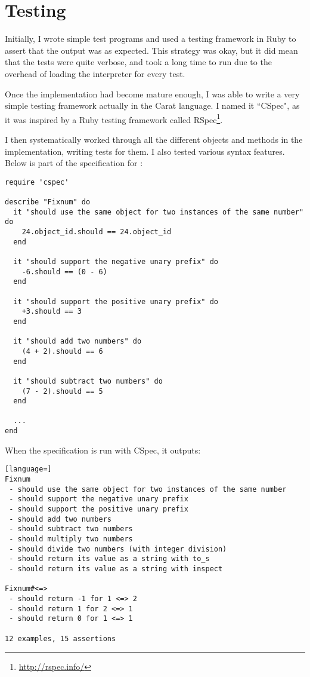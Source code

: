 \section{Testing}

Initially, I wrote simple test programs and used a testing framework in Ruby to assert that the output was as expected. This strategy was okay, but it did mean that the tests were quite verbose, and took a long time to run due to the overhead of loading the interpreter for every test.

Once the implementation had become mature enough, I was able to write a very simple testing framework actually in the Carat language. I named it ``CSpec", as it was inspired by a Ruby testing framework called RSpec\footnote{\url{http://rspec.info/}}.

I then systematically worked through all the different objects and methods in the implementation, writing tests for them. I also tested various syntax features. Below is part of the specification for :

\begin{lstlisting}
require 'cspec'

describe "Fixnum" do
  it "should use the same object for two instances of the same number" do
    24.object_id.should == 24.object_id
  end
  
  it "should support the negative unary prefix" do
    -6.should == (0 - 6)
  end
  
  it "should support the positive unary prefix" do
    +3.should == 3
  end
  
  it "should add two numbers" do
    (4 + 2).should == 6
  end
  
  it "should subtract two numbers" do
    (7 - 2).should == 5
  end
  
  ...
end
\end{lstlisting}

When the  specification is run with CSpec, it outputs:

\begin{minipage}{\textwidth}
\begin{lstlisting}[language=]
Fixnum
 - should use the same object for two instances of the same number
 - should support the negative unary prefix
 - should support the positive unary prefix
 - should add two numbers
 - should subtract two numbers
 - should multiply two numbers
 - should divide two numbers (with integer division)
 - should return its value as a string with to_s
 - should return its value as a string with inspect

Fixnum#<=>
 - should return -1 for 1 <=> 2
 - should return 1 for 2 <=> 1
 - should return 0 for 1 <=> 1

12 examples, 15 assertions
\end{lstlisting}
\end{minipage}

